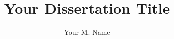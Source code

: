 \documentclass[thesis]{thesis-umich}
\title{Your Dissertation Title}
\author{Your M. Name}
\begin{document}


\begin{appendices}

\end{appendices}




\end{document}
